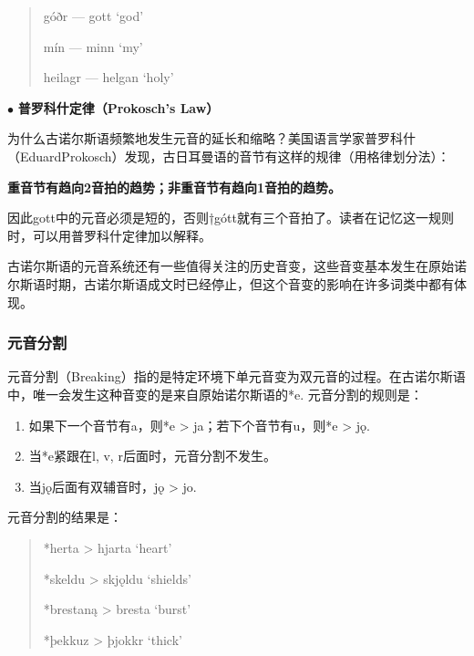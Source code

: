     \begin{quote}
        góðr --- gott `god'

        mín --- minn `my'

        heilagr --- helgan `holy'
    \end{quote}
    
    \begin{info}
        $\bullet$ \textbf{普罗科什定律（Prokosch's Law）}

        \indent
        为什么古诺尔斯语频繁地发生元音的延长和缩略？美国语言学家普罗科什（EduardProkosch）发现，古日耳曼语的音节有这样的规律（用格律划分法）：
        
        \indent
        \textbf{重音节有趋向2音拍的趋势；非重音节有趋向1音拍的趋势。}
        
        \indent
        因此gott中的元音必须是短的，否则†gótt就有三个音拍了\footnotemark[3]。读者在记忆这一规则时，可以用普罗科什定律加以解释。
    \end{info}

    
    古诺尔斯语的元音系统还有一些值得关注的历史音变，这些音变基本发生在原始诺尔斯语时期，古诺尔斯语成文时已经停止，但这个音变的影响在许多词类中都有体现。

\subsubsection{元音分割}
\label{元音分割}

    元音分割（Breaking）指的是特定环境下单元音变为双元音的过程。在古诺尔斯语中，唯一会发生这种音变的是来自原始诺尔斯语的*e. 元音分割的规则是：

    \begin{info}
        \begin{enumerate}
            \item 如果下一个音节有a，则*e > ja；若下个音节有u，则*e > jǫ.
            \item 当*e紧跟在l, v, r后面时，元音分割不发生。
            \item 当jǫ后面有双辅音时，jǫ > jo.
        \end{enumerate}
    \end{info}

    元音分割的结果是：

    \begin{quote}
        *herta \textgreater{} hjarta `heart'
      
        *skeldu \textgreater{} skjǫldu `shields'
      
        *brestaną \textgreater{} bresta `burst'
      
        *þekkuz \textgreater{} þjokkr `thick'
      \end{quote}
    
